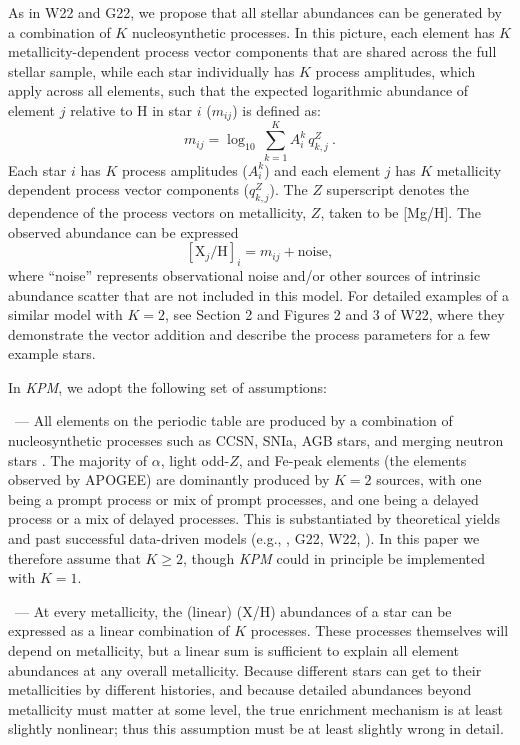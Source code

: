 \documentclass[modern]{aastex631}
\newcommand{\name}{\textsl{KPM}}
\renewcommand{\paragraph}[1]{\bigskip\par\noindent{\textbf{#1}}~---}
\begin{document}
As in W22 and G22, we propose that all stellar abundances can be generated by a combination of $K$ nucleosynthetic processes.
In this picture, each element has $K$ metallicity-dependent process vector components that are shared across the full stellar sample, while each star individually has $K$ process amplitudes, which apply across all elements, such that the expected logarithmic abundance of element $j$ relative to H in star $i$ ($m_{ij}$) is defined as:
\begin{equation}\label{eq:mij_k}
    m_{ij} = \log_{10} \, \sum^K_{k=1} A_i^k \, q_{k,j}^Z ~.
\end{equation}
Each star $i$ has $K$ process amplitudes ($A^k_i$)
and each element $j$ has $K$ metallicity dependent process vector components ($q_{k,j}^{Z}$). 
The $Z$ superscript denotes the dependence of the process vectors on metallicity, $Z$, taken to be [Mg/H].
The observed abundance can be expressed
\begin{equation}\label{eq:xh}
    [\text{X}_j/\text{H}]_i = m_{ij} + \text{noise},
\end{equation}
where ``noise'' represents observational noise and/or other sources of intrinsic abundance scatter that are not included in this model. For detailed examples of a similar model with $K=2$, see Section 2 and Figures 2 and 3 of W22, where they demonstrate the vector addition and describe the process parameters for a few example stars.

In \name{}, we adopt the following set of assumptions: 

\paragraph{1. $K$ processes}
All elements on the periodic table are produced by a combination of nucleosynthetic processes such as CCSN, SNIa, AGB stars, and merging neutron stars \citep{johnsonja2020}. The majority of $\alpha$, light odd-$Z$, and Fe-peak elements (the elements observed by APOGEE) are dominantly produced by $K=2$ sources, with one being a prompt process or mix of prompt processes, and one being a delayed process or a mix of delayed processes. This is substantiated by theoretical yields \citep[e.g.,][]{anderson2019, rybizki2017} and past successful data-driven models (e.g., \citealp{ness2019}, G22, W22, \citealp{ting2022, ratcliffe2023}). In this paper we therefore assume that $K \geq 2$, though \name{} could in principle be implemented with $K=1$.

\paragraph{2. Linearity}
At every metallicity, the (linear) (X/H) abundances of a star can be expressed as a linear combination of $K$ processes.
These processes themselves will depend on metallicity, but a linear sum is sufficient to explain all element abundances at any overall metallicity.
Because different stars can get to their metallicities by different histories, and because detailed abundances beyond metallicity must matter at some level, the true enrichment mechanism is at least slightly nonlinear; thus this assumption
must be at least slightly wrong in detail.
\end{document}
